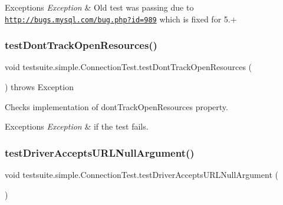 \begin{DoxyExceptions}{Exceptions}
{\em Exception} & Old test was passing due to \href{http://bugs.mysql.com/bug.php?id=989}{\tt http\+://bugs.\+mysql.\+com/bug.\+php?id=989} which is fixed for 5.+ \\
\hline
\end{DoxyExceptions}
\mbox{\label{classtestsuite_1_1simple_1_1_connection_test_a018eaff5a1cc1db390b843a77c50d63f}} 
\subsubsection{\texorpdfstring{test\+Dont\+Track\+Open\+Resources()}{testDontTrackOpenResources()}}
{\footnotesize\ttfamily void testsuite.\+simple.\+Connection\+Test.\+test\+Dont\+Track\+Open\+Resources (\begin{DoxyParamCaption}{ }\end{DoxyParamCaption}) throws Exception}

Checks implementation of \textquotesingle{}dont\+Track\+Open\+Resources\textquotesingle{} property.


\begin{DoxyExceptions}{Exceptions}
{\em Exception} & if the test fails. \\
\hline
\end{DoxyExceptions}
\mbox{\label{classtestsuite_1_1simple_1_1_connection_test_a20b111f18ff6ab2b7d2d95578d3613e4}} 
\subsubsection{\texorpdfstring{test\+Driver\+Accepts\+U\+R\+L\+Null\+Argument()}{testDriverAcceptsURLNullArgument()}}
{\footnotesize\ttfamily void testsuite.\+simple.\+Connection\+Test.\+test\+Driver\+Accepts\+U\+R\+L\+Null\+Argument (\begin{DoxyParamCaption}{ }\end{DoxyParamCaption})}


